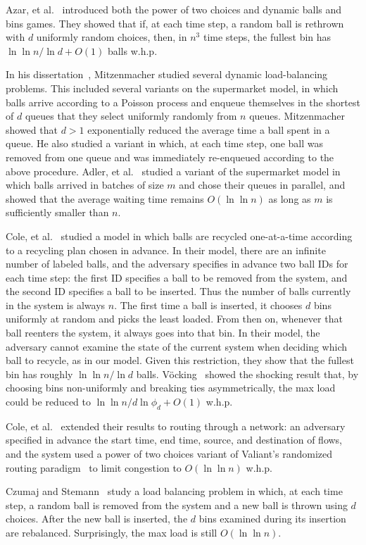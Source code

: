 Azar, et al.~\cite{AzarBrKa94} introduced both the power of two
choices and dynamic balls and bins games.  They showed that if, at
each time step, a random ball is rethrown with $d$ uniformly random
choices, then, in $n^3$ time steps, the fullest bin has $\ln \ln n /
\ln d + O(1)$ balls w.h.p.

In his dissertation~\cite{Mitzenmacher96}, Mitzenmacher studied several dynamic
load-balancing problems.  This included several variants on the supermarket
model, in which balls arrive according to a Poisson process and enqueue
themselves in the shortest of $d$ queues that they select uniformly randomly
from $n$ queues.  Mitzenmacher showed that $d>1$ exponentially reduced the
average time a ball spent in a queue.  He also studied a variant in which, at
each time step, one ball was removed from one queue and was immediately
re-enqueued according to the above procedure.  Adler, et al.~\cite{AdlerBeSc98}
studied a variant of the supermarket model in which balls arrived in batches of
size $m$ and chose their queues in parallel, and showed that the average
waiting time remains $O(\ln \ln n)$ as long as $m$ is sufficiently smaller than
$n$.

Cole, et al.~\cite{ColeFrMa98} studied a model in which balls are recycled
one-at-a-time according to a recycling plan chosen in advance.  In their model,
there are an infinite number of labeled balls, and the adversary specifies in
advance two ball IDs for each time step: the first ID specifies a ball to be
removed from the system, and the second ID specifies a ball to be inserted.
Thus the number of balls currently in the system is always $n$.  The first time
a ball is inserted, it chooses $d$ bins uniformly at random and picks the least
loaded. From then on, whenever that ball reenters the system, it always goes
into that bin.  In their model, the adversary cannot examine the state of the
current system when deciding which ball to recycle, as in our model.  Given
this restriction, they show that the fullest bin has roughly $\ln \ln n / \ln
d$ balls.  V\"{o}cking~\cite{Voecking03} showed the shocking result that, by
choosing bins non-uniformly and breaking ties asymmetrically, the max load
could be reduced to $\ln \ln n / d\ln\phi_d+O(1)$ w.h.p.

Cole, et al.~\cite{ColeMaMe98} extended their results to routing through a
network: an adversary specified in advance the start time, end time, source,
and destination of flows, and the system used a power of two choices variant of
Valiant's randomized routing paradigm~\cite{ValiantBr81} to limit congestion to
$O(\ln \ln n)$ w.h.p.

Czumaj and Stemann~\cite{CzumajSt97} study a load balancing problem in which,
at each time step, a random ball is removed from the system and a new ball is
thrown using $d$ choices.  After the new ball is inserted, the $d$ bins
examined during its insertion are rebalanced.  Surprisingly, the max load is
still $O(\ln \ln n)$.


